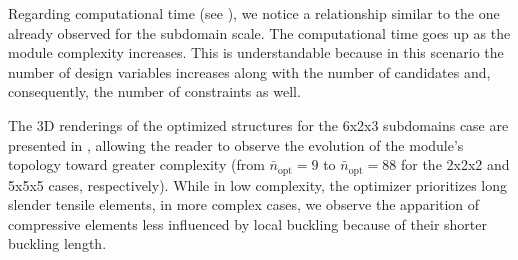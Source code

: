 Regarding computational time (see ), we notice a relationship similar to the one already observed for the subdomain scale. The computational time goes up as the module complexity increases. This is understandable because in this scenario the number of design variables increases along with the number of candidates and, consequently, the number of constraints as well.

The 3D renderings of the optimized structures for the 6x2x3 subdomains case are presented in , allowing the reader to observe the evolution of the module's topology toward greater complexity (from $\bar{n}_\text{opt}=9$ to $\bar{n}_\text{opt}=88$ for the 2x2x2 and 5x5x5 cases, respectively). While in low complexity, the optimizer prioritizes long slender tensile elements, in more complex cases, we observe the apparition of compressive elements less influenced by local buckling because of their shorter buckling length.


